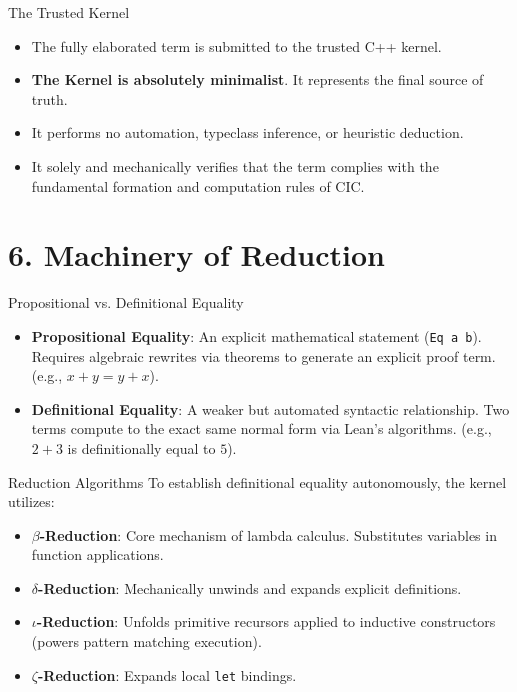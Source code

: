 \documentclass[12pt, aspectratio=169]{beamer}
\begin{document}
\begin{frame}{The Trusted Kernel}
\begin{itemize}\setlength{\itemsep}{1.2em}
  \item The fully elaborated term is submitted to the trusted C++ kernel.
  \item \textbf{The Kernel is absolutely minimalist}. It represents the final source of truth.
  \item It performs no automation, typeclass inference, or heuristic deduction.
  \item It solely and mechanically verifies that the term complies with the fundamental formation and computation rules of CIC.
\end{itemize}
\end{frame}

\section{6. Machinery of Reduction}

\begin{frame}{Propositional vs. Definitional Equality}
\begin{itemize}\setlength{\itemsep}{1.2em}
  \item \textbf{Propositional Equality}: An explicit mathematical statement (\texttt{Eq a b}). Requires algebraic rewrites via theorems to generate an explicit proof term. (e.g., $x + y = y + x$).
  \item \textbf{Definitional Equality}: A weaker but automated syntactic relationship. Two terms compute to the exact same normal form via Lean's algorithms. (e.g., $2 + 3$ is definitionally equal to $5$).
\end{itemize}
\end{frame}

\begin{frame}{Reduction Algorithms}
To establish definitional equality autonomously, the kernel utilizes:
\begin{itemize}\setlength{\itemsep}{1.2em}
  \item \textbf{$\beta$-Reduction}: Core mechanism of lambda calculus. Substitutes variables in function applications.
  \item \textbf{$\delta$-Reduction}: Mechanically unwinds and expands explicit definitions.
  \item \textbf{$\iota$-Reduction}: Unfolds primitive recursors applied to inductive constructors (powers pattern matching execution).
  \item \textbf{$\zeta$-Reduction}: Expands local \texttt{let} bindings.
\end{itemize}
\end{frame}
\end{document}
